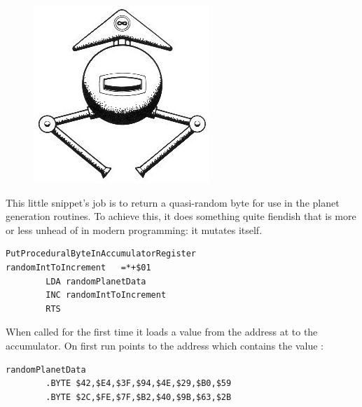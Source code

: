 \begin{definition}
\setlength{\intextsep}{0pt}%
\setlength{\columnsep}{3pt}%
\begin{figure}
\includegraphics[width=\linewidth]{src/callout/ia.jpg} 
\end{figure}
\small

This little snippet's job is to return a quasi-random byte for use in the planet generation
routines. To achieve this, it does something quite fiendish that is more or less unhead of in modern
programming: it mutates itself.

\begin{lstlisting}[caption=Neat.]
PutProceduralByteInAccumulatorRegister
randomIntToIncrement   =*+$01
        LDA randomPlanetData
        INC randomIntToIncrement
        RTS
\end{lstlisting}

When called for the first time it loads a value from the address at  to the accumulator. On first
run  points to the address  which contains the value :

\begin{lstlisting}[caption=Not Quite Random Bytes]
randomPlanetData
        .BYTE $42,$E4,$3F,$94,$4E,$29,$B0,$59
        .BYTE $2C,$FE,$7F,$B2,$40,$9B,$63,$2B
\end{lstlisting}


\end{definition}
